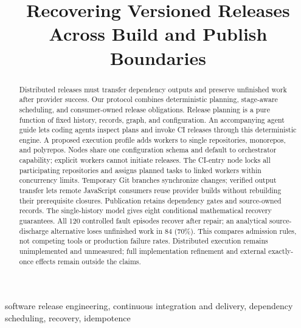 \documentclass[10pt,conference]{IEEEtran}
\theoremstyle{definition}
\begin{document}
\title{Recovering Versioned Releases Across Build and Publish Boundaries}
\maketitle
\begin{abstract}
Distributed releases must transfer dependency outputs and preserve unfinished
work after provider success. Our protocol combines deterministic planning,
stage-aware scheduling, and consumer-owned release obligations.
Release planning is a pure function of fixed history, records, graph, and
configuration. An accompanying agent guide lets coding agents inspect plans
and invoke CI releases through this deterministic engine.
A proposed execution profile adds workers to single
repositories, monorepos, and polyrepos. Nodes share one configuration schema
and default to orchestrator capability; explicit workers cannot initiate
releases. The CI-entry node locks all participating repositories and assigns
planned tasks to linked workers within concurrency limits. Temporary Git
branches synchronize changes; verified output transfer lets remote JavaScript
consumers reuse provider builds without rebuilding their prerequisite
closures. Publication retains dependency gates and source-owned records.
The single-history model gives eight conditional mathematical recovery guarantees.
All 120 controlled fault episodes recover after repair; an analytical
source-discharge alternative loses unfinished work in 84 (70\%). This compares
admission rules, not competing tools or production failure rates. Distributed
execution remains unimplemented and unmeasured; full implementation refinement
and external exactly-once effects remain outside the claims.
\end{abstract}
\begin{IEEEkeywords}
software release engineering, continuous integration and delivery,
dependency scheduling, recovery, idempotence
\end{IEEEkeywords}






\clearpage
{}

\end{document}

